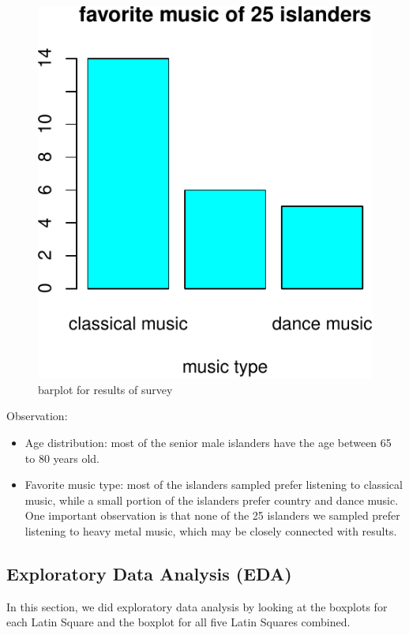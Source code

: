 \documentclass[]{article}
\providecommand{\tightlist}{%
  \setlength{\itemsep}{0pt}\setlength{\parskip}{0pt}}
\begin{document}
\begin{figure}
\centering
\includegraphics{STATS101B-Project_files/figure-latex/unnamed-chunk-3-1.pdf}
\caption{barplot for results of survey}
\end{figure}

Observation:

\begin{itemize}
\tightlist
\item
  Age distribution: most of the senior male islanders have the age
  between 65 to 80 years old.
\item
  Favorite music type: most of the islanders sampled prefer listening to
  classical music, while a small portion of the islanders prefer country
  and dance music. One important observation is that none of the 25
  islanders we sampled prefer listening to heavy metal music, which may
  be closely connected with results.
\end{itemize}

\subsection{Exploratory Data Analysis
(EDA)}\label{exploratory-data-analysis-eda}

In this section, we did exploratory data analysis by looking at the
boxplots for each Latin Square and the boxplot for all five Latin
Squares combined.
\end{document}
